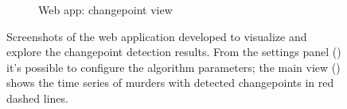\begin{figure}[H]
\begin{subfigure}{0.65\textwidth}
        \caption{Web app: changepoint view}
        \label{fig:changepoints-webapp}
    \end{subfigure}
    \caption{
        Screenshots of the web application developed to visualize and explore the changepoint detection results. From the settings panel () it's possible to configure the algorithm parameters; the main view () shows the time series of murders with detected changepoints in red dashed lines.
    }
    \label{fig:changepoints-webapp-full}
\end{figure}